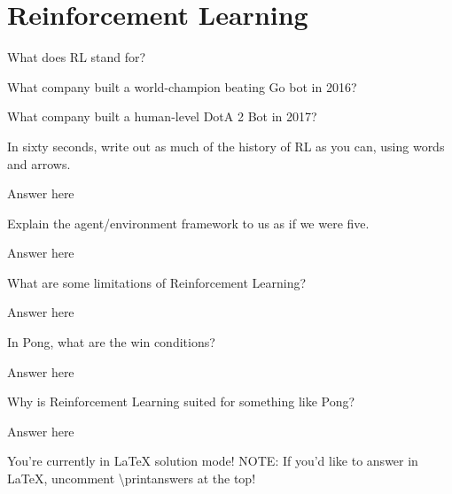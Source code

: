 \documentclass{exam}
\begin{document}
\section{Reinforcement Learning}
\begin{questions}

\question What does RL stand for?

\question What company built a world-champion beating Go bot in 2016?

\question What company built a human-level DotA 2 Bot in 2017?

\question In sixty seconds, write out as much of the history of RL as you can, using words and arrows.

\begin{solution}[.2in]
Answer here
\end{solution}

\question Explain the agent/environment framework to us as if we were five.

\begin{solution}[.2in]
Answer here
\end{solution}

\question What are some limitations of Reinforcement Learning?

\begin{solution}[.2in]
Answer here
\end{solution}

\question In Pong, what are the win conditions?

\begin{solution}[.2in]
Answer here
\end{solution}

\question Why is Reinforcement Learning suited for something like Pong?

\begin{solution}[.2in]
Answer here
\end{solution}


\end{questions}

\ifprintanswers
You're currently in LaTeX solution mode!
\else
NOTE: If you'd like to answer in LaTeX, uncomment \textbackslash printanswers at the top!
\fi
\end{document}
